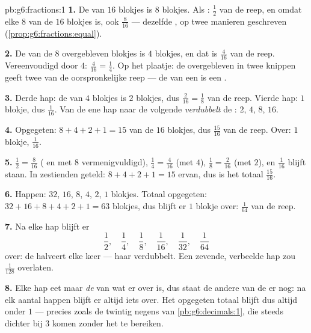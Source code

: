 \begin{solution}{pb:g6:fractions:1}
\textbf{1.} De  van $16$ blokjes is $8$ blokjes. Als : $\frac12$ van
de reep, en omdat elke  $8$ van de $16$ blokjes is, ook $\frac{8}{16}$ ---
dezelfde , op twee manieren geschreven
(\cref{prop:g6:fractions:equal}).

\textbf{2.} De  van de $8$ overgebleven blokjes is $4$ blokjes, en dat is
$\frac{4}{16}$ van de reep. Vereenvoudigd door $4$: $\frac{4}{16} = \frac14$.
Op het plaatje: de overgebleven  in twee knippen geeft twee  van de
oorspronkelijke reep --- de  van een  is een .

\textbf{3.} Derde hap: de  van $4$ blokjes is $2$ blokjes, dus
$\frac{2}{16} = \frac18$ van de reep. Vierde hap: $1$ blokje, dus
$\frac{1}{16}$. Van de ene hap naar de volgende \emph{verdubbelt} de :
$2$, $4$, $8$, $16$.

\textbf{4.} Opgegeten: $8 + 4 + 2 + 1 = 15$ van de $16$ blokjes, dus
$\frac{15}{16}$ van de reep. Over: $1$ blokje, $\frac{1}{16}$.

\textbf{5.} $\frac12 = \frac{8}{16}$ ( en  met $8$
vermenigvuldigd), $\frac14 = \frac{4}{16}$ (met $4$),
$\frac18 = \frac{2}{16}$ (met $2$), en $\frac{1}{16}$ blijft staan. In
zestienden geteld: $8 + 4 + 2 + 1 = 15$ ervan, dus is het totaal
$\frac{15}{16}$.

\textbf{6.} Happen: $32$, $16$, $8$, $4$, $2$, $1$ blokjes. Totaal opgegeten:
$32 + 16 + 8 + 4 + 2 + 1 = 63$ blokjes, dus blijft er $1$ blokje over:
$\frac{1}{64}$ van de reep.

\textbf{7.} Na elke hap blijft er
\[
\frac12,\quad \frac14,\quad \frac18,\quad \frac{1}{16},\quad
\frac{1}{32},\quad \frac{1}{64}
\]
over: de  halveert elke keer --- haar  verdubbelt. Een zevende,
verbeelde hap zou $\frac{1}{128}$ overlaten.

\textbf{8.} Elke hap eet maar \emph{de } van wat er over is, dus staat de
andere  van de  er nog: na elk aantal happen blijft er altijd iets
over. Het opgegeten totaal blijft dus altijd onder $1$ --- precies zoals de
twintig negens van \cref{pb:g6:decimals:1}, die steeds dichter bij $3$ komen
zonder het te bereiken.


\end{solution}
